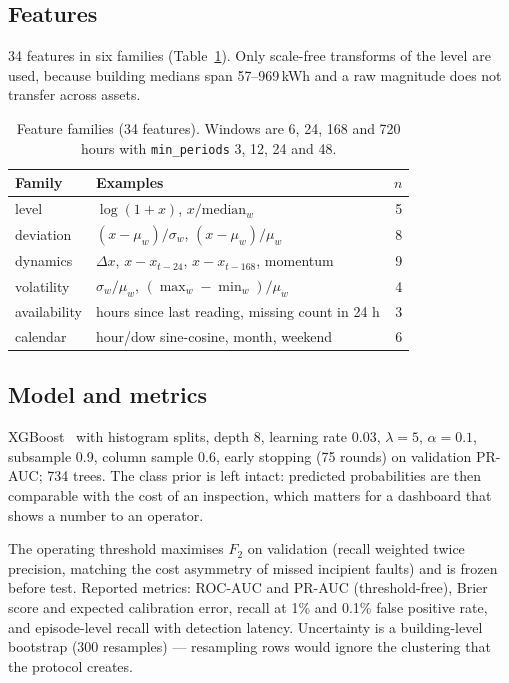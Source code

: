 \documentclass[conference]{IEEEtran}
\begin{document}
\subsection{Features}

34 features in six families (Table~\ref{tab:features}). Only scale-free transforms of the level are
used, because building medians span 57--969\,kWh and a raw magnitude does not transfer across assets.

\begin{table}[t]
\centering
\caption{Feature families (34 features). Windows are 6, 24, 168 and 720 hours with
\texttt{min\_periods} 3, 12, 24 and 48.}
\label{tab:features}
\footnotesize
\setlength{\tabcolsep}{4pt}
\begin{tabular}{llr}
\toprule
Family & Examples & $n$ \\
\midrule
level & $\log(1+x)$, $x/\mathrm{median}_{w}$ & 5 \\
deviation & $(x-\mu_w)/\sigma_w$, $(x-\mu_w)/\mu_w$ & 8 \\
dynamics & $\Delta x$, $x-x_{t-24}$, $x-x_{t-168}$, momentum & 9 \\
volatility & $\sigma_w/\mu_w$, $(\max_w-\min_w)/\mu_w$ & 4 \\
availability & hours since last reading, missing count in 24 h & 3 \\
calendar & hour/dow sine-cosine, month, weekend & 6 \\
\bottomrule
\end{tabular}
\end{table}

\subsection{Model and metrics}

XGBoost~\cite{chen2016} with histogram splits, depth 8, learning rate 0.03, $\lambda=5$,
$\alpha=0.1$, subsample 0.9, column sample 0.6, early stopping (75 rounds) on validation PR-AUC;
734 trees. The class prior is left intact: predicted probabilities are then comparable with the cost
of an inspection, which matters for a dashboard that shows a number to an operator.

The operating threshold maximises $F_2$ on validation (recall weighted twice precision, matching the
cost asymmetry of missed incipient faults) and is frozen before test. Reported metrics: ROC-AUC and
PR-AUC (threshold-free), Brier score and expected calibration error, recall at 1\% and 0.1\% false
positive rate, and episode-level recall with detection latency. Uncertainty is a building-level
bootstrap (300 resamples) --- resampling rows would ignore the clustering that the protocol creates.
\end{document}
